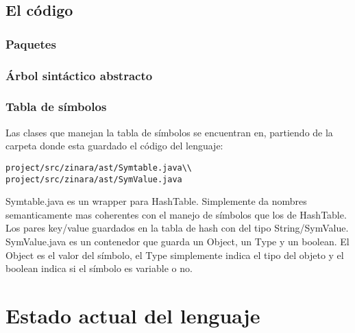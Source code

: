 \documentclass[12pt, spanish]{report}
\begin{document}
\section{El c\'odigo}
\label{sec:codigo}

\subsection{Paquetes}
\label{sec:paquetes}

\subsection{\'Arbol sint\'actico abstracto}
\label{sec:ast}

\subsection{Tabla de s\'imbolos}
\label{sec:st}
Las clases que manejan la tabla de s\'imbolos se encuentran en,
partiendo de la carpeta donde esta guardado el c\'odigo del lenguaje:
\begin{verbatim}
project/src/zinara/ast/Symtable.java\\
project/src/zinara/ast/SymValue.java
\end{verbatim}
\indent Symtable.java es un wrapper para HashTable. Simplemente da
nombres semanticamente mas coherentes con el manejo de s\'imbolos que
los de HashTable. Los pares key/value guardados en la tabla de hash con
del tipo String/SymValue.\\
\indent SymValue.java es un contenedor que guarda un Object, un Type y
un boolean. El Object es el valor del s\'imbolo, el Type simplemente
indica el tipo del objeto y el boolean indica si el s\'imbolo es
variable o no. 

\chapter{Estado actual del lenguaje}
\label{chap:estado}
\end{document}
